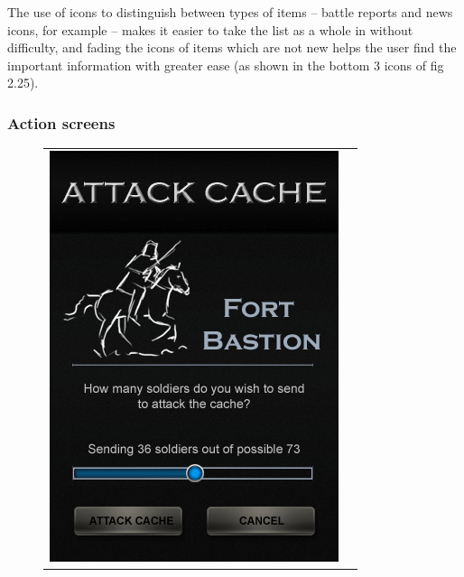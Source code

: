 The use of icons to distinguish between types of items – battle reports and news icons, for example – makes it easier to take the list as a whole in without difficulty, and fading the icons of items which are not new helps the user find the important information with greater ease (as shown in the bottom 3 icons of fig 2.25).

\subsubsection{Action screens}

\begin{figure}[h!]
\centering
\begin{tabular}{cc}
	\begin{minipage}{0.3\textwidth}
		\begin{center}
		\begin{minipage}{0.83\textwidth}
		\includegraphics[width=\textwidth]{images/attack_cache_mockup}

\end{minipage}
\end{center}
\end{minipage}
\end{tabular}
\end{figure}
